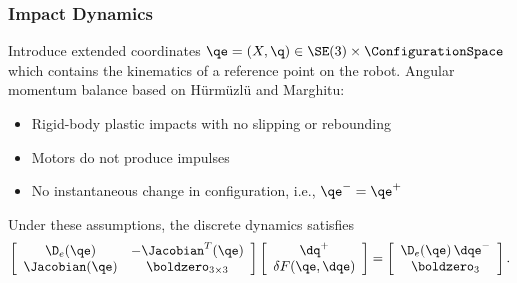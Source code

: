 \begin{frame}[t]
  \frametitle{Impact Dynamics}
  Introduce extended coordinates $\qe = (X, \q) \in \SE(3) \times \ConfigurationSpace$ which contains the kinematics of a reference point on the robot. Angular momentum balance based on H{\"u}rm{\"u}zl{\"u} and Marghitu:
  \begin{massump}
    \vspace{-.3em}
    \begin{itemize}
    \item Rigid-body plastic impacts with no slipping or rebounding
    \item Motors do not produce impulses
    \item No instantaneous change in configuration, i.e., $\qe^{-} = \qe^{+}$
    \end{itemize}
  \end{massump}\vspace{-.5em}
  Under these assumptions, the discrete dynamics satisfies
  \begin{align*}
    \left[\begin{array}{c c}
        \D_{e}(\qe) & -\Jacobian^{T}(\qe)\\
        \Jacobian(\qe) & \boldzero_{3 \times 3}
      \end{array}\right]
    \left[\begin{array}{c}
        \dq^{+}\\
        \delta F(\qe, \dqe)
      \end{array}\right]
    = \left[\begin{array}{c c}
        \D_{e}(\qe) \, \dqe^{-}\\
        \boldzero_{3}
      \end{array}\right].
  \end{align*}
\end{frame}

